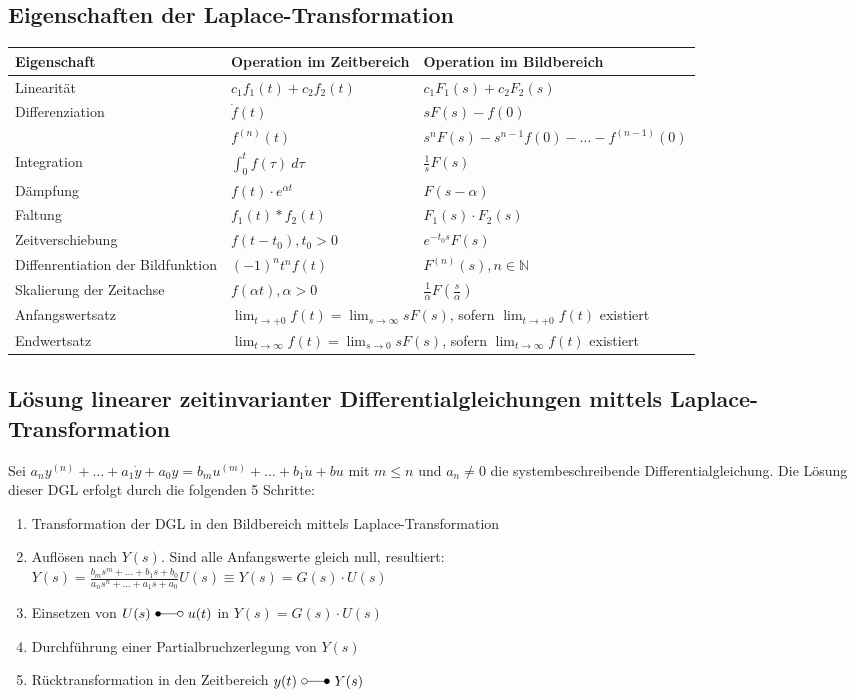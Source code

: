 \documentclass[10pt,a4paper]{article}
\begin{document}
\subsection{Eigenschaften der Laplace-Transformation}
\begin{tabularx}{\columnwidth}{|X|X|X|}
	\hline
	Eigenschaft & Operation im Zeitbereich & Operation im Bildbereich \\
	\hline
	\hline
	Linearität & $c_1f_1(t) + c_2f_2(t)$ & $c_1 F_1(s) + c_2 F_2(s)$ \\
	\hline
	Differenziation & $\dot f(t)$ & $sF(s) - f(0)$ \\
	& $f^{(n)}(t)$ & $s^n F(s) - s^{n - 1} f(0) - \dots - f^{(n-1)}(0)$ \\
	\hline
	Integration & $\int_0^t f(\tau) ~d\tau$ & $\frac 1 s F(s)$ \\
	\hline
	Dämpfung & $f(t) ⋅ e^{\alpha t}$ & $F(s-\alpha)$ \\
	\hline
	Faltung & $f_1(t) * f_2(t)$ & $F_1(s) ⋅ F_2(s)$ \\
	\hline
	Zeitverschiebung & $f(t - t_0), t_0 > 0$ & $e^{-t_0 s}F(s)$ \\
	\hline
	Diffenrentiation der Bildfunktion & $(-1)^n t^n f(t)$ & $F^{(n)}(s), n \in \mathbb{N}$ \\
	\hline
	Skalierung der Zeitachse & $f(\alpha t), \alpha > 0$ & $\frac 1 \alpha F(\frac s \alpha)$ \\
	\hline
	Anfangswertsatz & \multicolumn{2}{X|}{$\lim_{t → +0} f(t) = \lim_{s → ∞} s F(s)$, sofern $\lim_{t → +0} f(t)$ existiert} \\
	\hline
	Endwertsatz & \multicolumn{2}{X|}{$\lim_{t → ∞} f(t) = \lim_{s → 0} sF(s)$, sofern $\lim_{t → ∞} f(t)$ existiert} \\
	\hline
\end{tabularx}

\subsection{Lösung linearer zeitinvarianter Differentialgleichungen mittels Laplace-Transformation}
Sei $a_ny^{(n)} + \dots + a_1 \dot y + a_0 y = b_m u^{(m)} + \dots + b_1 \dot u + b u$ mit $m ≤ n$ und $a_n ≠ 0$ die systembeschreibende Differentialgleichung.
Die Lösung dieser DGL erfolgt durch die folgenden 5 Schritte:
\begin{enumerate}
	\item Transformation der DGL in den Bildbereich mittels Laplace-Transformation
	\item Auflösen nach $Y(s)$. Sind alle Anfangswerte gleich null, resultiert: \\
	$Y(s) = \frac{b_ms^m + \dots + b_1s + b_0}{a_ns^n + \dots + a_1s + a_0} U(s) ≡ Y(s) = G(s) ⋅ U(s)$
	\item Einsetzen von $U(s) ~\Laplace ~u(t)$ in $Y(s) = G(s) ⋅ U(s)$
	\item Durchführung einer Partialbruchzerlegung von $Y(s)$
	\item Rücktransformation in den Zeitbereich $y(t) ~\laplace ~Y(s)$
\end{enumerate}
\end{document}
